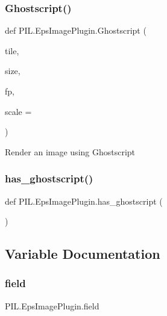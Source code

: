 \subsubsection{\texorpdfstring{Ghostscript()}{Ghostscript()}}
{\footnotesize\ttfamily def P\+I\+L.\+Eps\+Image\+Plugin.\+Ghostscript (\begin{DoxyParamCaption}\item[{}]{tile,  }\item[{}]{size,  }\item[{}]{fp,  }\item[{}]{scale = {} }\end{DoxyParamCaption})}

\begin{DoxyVerb}Render an image using Ghostscript\end{DoxyVerb}
 \mbox{\label{namespacePIL_1_1EpsImagePlugin_ac79d0a396177e8b70c73daff0ce0f643}} 
\subsubsection{\texorpdfstring{has\+\_\+ghostscript()}{has\_ghostscript()}}
{\footnotesize\ttfamily def P\+I\+L.\+Eps\+Image\+Plugin.\+has\+\_\+ghostscript (\begin{DoxyParamCaption}{ }\end{DoxyParamCaption})}



\subsection{Variable Documentation}
\mbox{\label{namespacePIL_1_1EpsImagePlugin_a50be947ea5f8515eb46df3e5e6139e52}} 
\subsubsection{\texorpdfstring{field}{field}}
{\footnotesize\ttfamily P\+I\+L.\+Eps\+Image\+Plugin.\+field}

